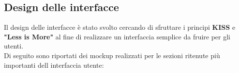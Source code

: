 \documentclass{report}
\begin{document}
\subsection{Design delle interfacce}
Il design delle interfacce è stato svolto cercando di sfruttare i principi \textbf{KISS} e \textbf{"Less is More"} al fine di realizzare un interfaccia semplice da fruire per gli utenti.\\
Di seguito sono riportati dei mockup realizzati per le sezioni ritenute più importanti dell interfaccia utente:

\begin{figure}[H]
   \begin{subfigure}{.5\textwidth}
  \centering

\end{subfigure}
\end{figure}
\end{document}
